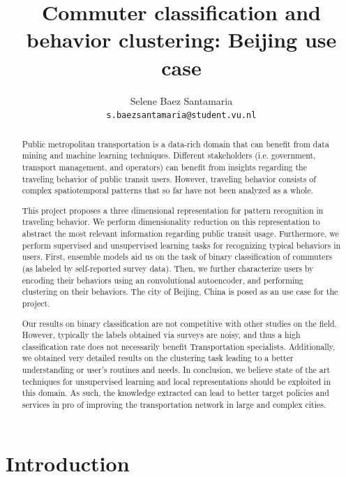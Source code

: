 \documentclass{article}
\title{Commuter classification and behavior clustering: Beijing use case}
\author{
  Selene Baez  Santamaria \\
  \texttt{s.baezsantamaria@student.vu.nl}
}
\begin{document}

\maketitle

\begin{abstract}
  Public metropolitan transportation is a data-rich domain that can benefit from data mining and machine learning techniques. Different stakeholders (i.e. government, transport management, and operators) can benefit from insights regarding the traveling behavior of public transit users. However, traveling behavior consists of complex  spatiotemporal patterns that so far have not been analyzed as a whole.
  
  This project proposes a three dimensional representation for pattern recognition in traveling behavior. We perform dimensionality reduction on this representation to abstract the most relevant information regarding public transit usage. Furthermore, we perform supervised and unsupervised learning tasks for recognizing typical behaviors in users. First, ensemble models aid us on the task of binary classification of commuters (as labeled by self-reported survey data). Then, we further characterize users by encoding their behaviors using an convolutional autoencoder, and performing clustering on their behaviors. The city of Beijing, China is posed as an use case for the project. 
  
  Our results on binary classification are not competitive with other studies on the field. However, typically the labels obtained via surveys are noisy, and thus a high classification rate does not necessarily benefit Transportation specialists. Additionally, we obtained very detailed results on the clustering task leading to a better understanding or user's routines and needs. In conclusion, we believe state of the art techniques for  unsupervised learning and local representations should be exploited in this domain. As such, the knowledge extracted can lead to better target policies and services in pro of improving the transportation network in large and complex cities.    
  
\end{abstract}

\newpage

\tableofcontents

\newpage
\section{Introduction}
\end{document}
